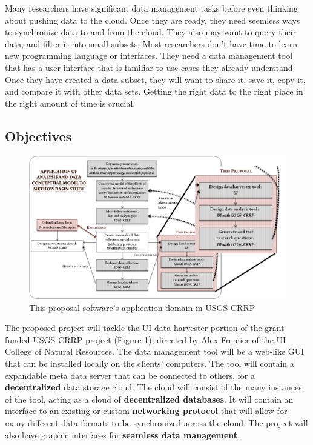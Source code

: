 Many researchers have significant data management tasks before even thinking 
about pushing data to the cloud. Once they are ready, they need seemless ways to
synchronize data to and from the cloud. They also may want to query their data,
and filter it into small subsets. Most researchers don't have time to learn
new programming language or interfaces. They need a data management tool 
that has a user 
interface that is familiar to use cases they already understand. Once they
have created a data subset, they will want to share it, save it, copy it, 
and compare it with other data sets. Getting the right data to the right place 
in the right amount of time is crucial.

\subsection{Objectives}

\begin{figure}[!h]
        \begin{center}
		\includegraphics[width=120mm]{images/combo_proposal}
                \caption{This proposal software's application domain in USGS-CRRP}
                \label{combo_proposal}
        \end{center}
\end{figure}

The proposed project will tackle the UI data harvester portion of the grant 
funded USGS-CRRP project (Figure \ref{combo_proposal}), directed by Alex 
Fremier of the UI College of Natural Resources. The data management tool
will be a web-like GUI that can be installed locally on the clients' computers.
The tool will contain a expandable meta data server 
that can be connected to others, for a \textbf{decentralized} data storage
cloud. The cloud will consist of the many instances of the tool, acting as a
cloud of 
\textbf{decentralized databases}. It will contain an interface to an existing 
or custom \textbf{networking protocol} that will allow for many different data 
formats to be synchronized across the cloud. The project will also have graphic
interfaces for \textbf{seamless data management}.

